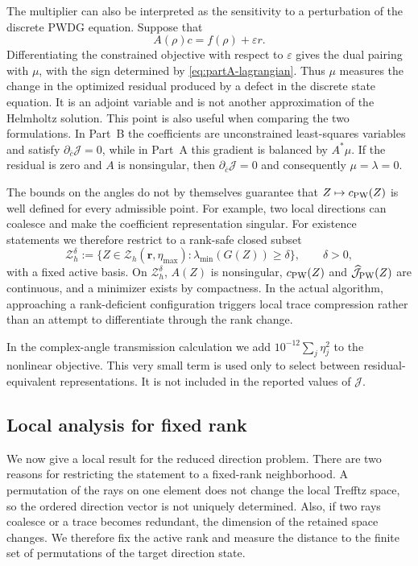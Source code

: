 \documentclass[pdflatex,sn-mathphys-num]{sn-jnl}
\theoremstyle{thmstyleone}
\theoremstyle{thmstyletwo}
\begin{document}
The multiplier can also be interpreted as the sensitivity to a perturbation of the discrete PWDG equation.  Suppose that
\[
 A(\rho)c=f(\rho)+\varepsilon r.
\]
Differentiating the constrained objective with respect to $\varepsilon$ gives the dual pairing with $\mu$, with the sign determined by \eqref{eq:partA-lagrangian}.  Thus $\mu$ measures the change in the optimized residual produced by a defect in the discrete state equation.  It is an adjoint variable and is not another approximation of the Helmholtz solution.  This point is also useful when comparing the two formulations.  In Part~B the coefficients are unconstrained least-squares variables and satisfy $\partial_{\bar c}\mathcal J=0$, while in Part~A this gradient is balanced by $A^*\mu$.  If the residual is zero and $A$ is nonsingular, then $\partial_{\bar c}\mathcal J=0$ and consequently $\mu=\lambda=0$.

The bounds on the angles do not by themselves guarantee that $Z\mapsto c_{\rm PW}(Z)$ is well defined for every admissible point.  For example, two local directions can coalesce and make the coefficient representation singular.  For existence statements we therefore restrict to a rank-safe closed subset
\begin{equation}\label{eq:Zdelta}
 \mathcal Z_h^\delta
 :=\{Z\in\mathcal Z_h(\bm r,\eta_{\max}):\lambda_{\min}(G(Z))\ge\delta\},
 \qquad \delta>0,
\end{equation}
with a fixed active basis.  On $\mathcal Z_h^\delta$, $A(Z)$ is nonsingular, $c_{\rm PW}(Z)$ and $\widehat{\mathcal J}_{\rm PW}(Z)$ are continuous, and a minimizer exists by compactness.  In the actual algorithm, approaching a rank-deficient configuration triggers local trace compression rather than an attempt to differentiate through the rank change.

In the complex-angle transmission calculation we add $10^{-12}\sum_j\eta_j^2$ to the nonlinear objective.  This very small term is used only to select between residual-equivalent representations.  It is not included in the reported values of $\mathcal J$.


\subsection{Local analysis for fixed rank}\label{subsec:local-theory}
We now give a local result for the reduced direction problem.  There are two reasons for restricting the statement to a fixed-rank neighborhood.  A permutation of the rays on one element does not change the local Trefftz space, so the ordered direction vector is not uniquely determined.  Also, if two rays coalesce or a trace becomes redundant, the dimension of the retained space changes.  We therefore fix the active rank and measure the distance to the finite set of permutations of the target direction state.
\end{document}
